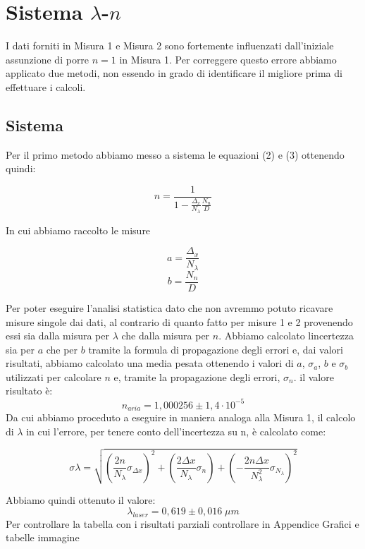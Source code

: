 \documentclass{article}
\begin{document}
\section{Sistema $\lambda$-$n$}
I dati forniti in Misura 1 e Misura 2 sono fortemente influenzati dall'iniziale assunzione di porre $n = 1$ in Misura 1. Per correggere questo errore abbiamo applicato due metodi, non essendo in grado di identificare il migliore prima di effettuare i calcoli. 



\subsection{Sistema}
Per il primo metodo abbiamo messo a sistema le equazioni (2) e (3) ottenendo quindi:

\begin{equation} 
n= \frac{1}{1 - \frac{\Delta_x}{N_\lambda} \frac{N_n}{D}} 
\end{equation}

In cui abbiamo raccolto le misure

\[ a = \frac{\Delta_x}{N_\lambda} \]
\[ b = \frac{N_n}{D} \]

Per poter eseguire l'analisi statistica dato che non avremmo potuto ricavare misure singole dai dati, al contrario di quanto fatto per misure 1 e 2 provenendo essi sia dalla misura per $\lambda$ che dalla misura per $n$. Abbiamo calcolato lincertezza sia per $a$ che per $b$ tramite la formula di propagazione degli errori e, dai valori risultati, abbiamo calcolato una media pesata ottenendo i valori di $a$, $\sigma_a$, $b$ e $\sigma_b$ utilizzati per calcolare $n$ e, tramite la propagazione degli errori, $\sigma_n$. il valore risultato è:
\[ n_{aria} = 1,000256 \pm 1,4 \cdot 10^{-5} \]
Da cui abbiamo proceduto a eseguire in maniera analoga alla Misura 1, il calcolo di $\lambda$ in cui l'errore, per tenere conto dell'incertezza su n, è calcolato come:

\begin{equation} 
\sigma\lambda= \sqrt{\left(\frac{2 n}{N_\lambda} \sigma_{\Delta x}\right)^2 + \left(\frac{2 \Delta x}{N_\lambda} \sigma_n\right) + \left({-} \frac{2 n \Delta x}{N_\lambda^2} \sigma_{N_\lambda}\right)^2} 
\end{equation}

Abbiamo quindi ottenuto il valore:
\[ \lambda_{laser} = 0,619 \pm 0,016 \; \mu m \]
Per controllare la tabella con i risultati parziali controllare in Appendice Grafici e tabelle immagine %
\end{document}
